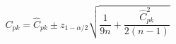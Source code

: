 

\[
C_{pk} = \hat{C}_{pk} \pm z_{1-\alpha/2}\sqrt{\frac{1}{9n} + \frac{\hat{C}_{pk}^{2}}{2(n-1)}}
\]


